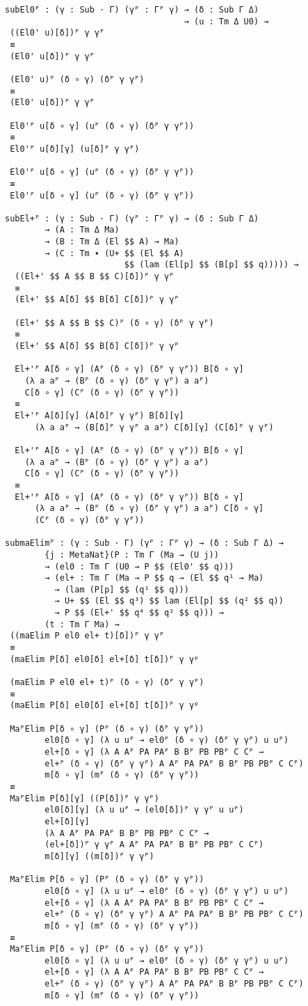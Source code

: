 \begin{verbatim}
subEl0ᴾ : (γ : Sub · Γ) (γᴾ : Γᴾ γ) → (δ : Sub Γ Δ)
                                    → (u : Tm Δ U0) →
 ((El0' u)[δ])ᴾ γ γᴾ
 ≡
 (El0' u[δ])ᴾ γ γᴾ

 (El0' u)ᴾ (δ ∘ γ) (δᴾ γ γᴾ)
 ≡
 (El0' u[δ])ᴾ γ γᴾ

 El0'ᴾ u[δ ∘ γ] (uᴾ (δ ∘ γ) (δᴾ γ γᴾ))
 ≡
 El0'ᴾ u[δ][γ] (u[δ]ᴾ γ γᴾ)

 El0'ᴾ u[δ ∘ γ] (uᴾ (δ ∘ γ) (δᴾ γ γᴾ))
 ≡
 El0'ᴾ u[δ ∘ γ] (uᴾ (δ ∘ γ) (δᴾ γ γᴾ))

subEl+ᴾ : (γ : Sub · Γ) (γᴾ : Γᴾ γ) → (δ : Sub Γ Δ)
        → (A : Tm Δ Ma)
        → (B : Tm Δ (El $$ A) → Ma)
        → (C : Tm ∙ (U+ $$ (El $$ A)
                        $$ (lam (El[p] $$ (B[p] $$ q))))) →
  ((El+' $$ A $$ B $$ C)[δ])ᴾ γ γᴾ
  ≡
  (El+' $$ A[δ] $$ B[δ] C[δ])ᴾ γ γᴾ

  (El+' $$ A $$ B $$ C)ᴾ (δ ∘ γ) (δᴾ γ γᴾ)
  ≡
  (El+' $$ A[δ] $$ B[δ] C[δ])ᴾ γ γᴾ

  El+'ᴾ A[δ ∘ γ] (Aᴾ (δ ∘ γ) (δᴾ γ γᴾ)) B[δ ∘ γ]
    (λ a aᴾ → (Bᴾ (δ ∘ γ) (δᴾ γ γᴾ) a aᴾ)
    C[δ ∘ γ] (Cᴾ (δ ∘ γ) (δᴾ γ γᴾ))
  ≡
  El+'ᴾ A[δ][γ] (A[δ]ᴾ γ γᴾ) B[δ][γ]
      (λ a aᴾ → (B[δ]ᴾ γ γᴾ a aᴾ) C[δ][γ] (C[δ]ᴾ γ γᴾ)

  El+'ᴾ A[δ ∘ γ] (Aᴾ (δ ∘ γ) (δᴾ γ γᴾ)) B[δ ∘ γ]
    (λ a aᴾ → (Bᴾ (δ ∘ γ) (δᴾ γ γᴾ) a aᴾ)
    C[δ ∘ γ] (Cᴾ (δ ∘ γ) (δᴾ γ γᴾ))
  ≡
  El+'ᴾ A[δ ∘ γ] (Aᴾ (δ ∘ γ) (δᴾ γ γᴾ)) B[δ ∘ γ]
      (λ a aᴾ → (Bᴾ (δ ∘ γ) (δᴾ γ γᴾ) a aᴾ) C[δ ∘ γ]
      (Cᴾ (δ ∘ γ) (δᴾ γ γᴾ))

submaElimᴾ : (γ : Sub · Γ) (γᴾ : Γᴾ γ) → (δ : Sub Γ Δ) →
        {j : MetaNat}(P : Tm Γ (Ma → (U j))
        → (el0 : Tm Γ (U0 → P $$ (El0' $$ q)))
        → (el+ : Tm Γ (Ma → P $$ q → (El $$ q¹ → Ma)
          → (lam (P[p] $$ (q¹ $$ q)))
          → U+ $$ (El $$ q³) $$ lam (El[p] $$ (q² $$ q))
          → P $$ (El+' $$ q⁴ $$ q² $$ q))) →
        (t : Tm Γ Ma) →
 ((maElim P el0 el+ t)[δ])ᴾ γ γᴾ
 ≡
 (maElim P[δ] el0[δ] el+[δ] t[δ])ᴾ γ γᵖ

 (maElim P el0 el+ t)ᴾ (δ ∘ γ) (δᴾ γ γᴾ)
 ≡
 (maElim P[δ] el0[δ] el+[δ] t[δ])ᴾ γ γᵖ

 MaᴾElim P[δ ∘ γ] (Pᴾ (δ ∘ γ) (δᴾ γ γᴾ))
        el0[δ ∘ γ] (λ u uᴾ → el0ᴾ (δ ∘ γ) (δᴾ γ γᴾ) u uᴾ)
        el+[δ ∘ γ] (λ A Aᴾ PA PAᴾ B Bᴾ PB PBᴾ C Cᴾ →
        el+ᴾ (δ ∘ γ) (δᴾ γ γᴾ) A Aᴾ PA PAᴾ B Bᴾ PB PBᴾ C Cᴾ)
        m[δ ∘ γ] (mᴾ (δ ∘ γ) (δᴾ γ γᴾ))
 ≡
 MaᴾElim P[δ][γ] ((P[δ])ᴾ γ γᴾ)
        el0[δ][γ] (λ u uᴾ → (el0[δ])ᴾ γ γᴾ u uᴾ)
        el+[δ][γ]
        (λ A Aᴾ PA PAᴾ B Bᴾ PB PBᴾ C Cᴾ →
        (el+[δ])ᴾ γ γᴾ A Aᴾ PA PAᴾ B Bᴾ PB PBᴾ C Cᴾ)
        m[δ][γ] ((m[δ])ᴾ γ γᴾ)

 MaᴾElim P[δ ∘ γ] (Pᴾ (δ ∘ γ) (δᴾ γ γᴾ))
        el0[δ ∘ γ] (λ u uᴾ → el0ᴾ (δ ∘ γ) (δᴾ γ γᴾ) u uᴾ)
        el+[δ ∘ γ] (λ A Aᴾ PA PAᴾ B Bᴾ PB PBᴾ C Cᴾ →
        el+ᴾ (δ ∘ γ) (δᴾ γ γᴾ) A Aᴾ PA PAᴾ B Bᴾ PB PBᴾ C Cᴾ)
        m[δ ∘ γ] (mᴾ (δ ∘ γ) (δᴾ γ γᴾ))
 ≡
 MaᴾElim P[δ ∘ γ] (Pᴾ (δ ∘ γ) (δᴾ γ γᴾ))
        el0[δ ∘ γ] (λ u uᴾ → el0ᴾ (δ ∘ γ) (δᴾ γ γᴾ) u uᴾ)
        el+[δ ∘ γ] (λ A Aᴾ PA PAᴾ B Bᴾ PB PBᴾ C Cᴾ →
        el+ᴾ (δ ∘ γ) (δᴾ γ γᴾ) A Aᴾ PA PAᴾ B Bᴾ PB PBᴾ C Cᴾ)
        m[δ ∘ γ] (mᴾ (δ ∘ γ) (δᴾ γ γᴾ))
\end{verbatim}
